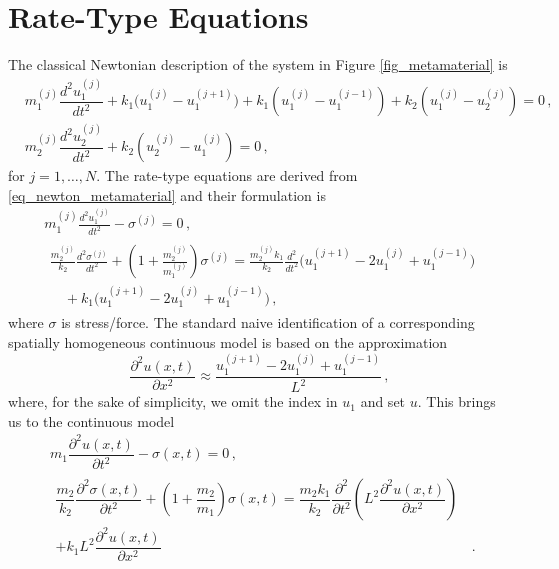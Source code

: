\documentclass[11pt,a4paper,oneside,openright]{report} %
\begin{document}
\section{Rate-Type Equations}
\noindent
The classical Newtonian description of the system in Figure \ref{fig_metamaterial} is
\begin{subequations}\label{eq_newton_metamaterial}
    \begin{align}
        & m_1^{(j)} \dfrac{d^2 u_1^{(j)}}{dt^2} + k_1 \bigl( u_1^{(j)} - u_1^{(j+1)}\bigr) + k_1 \left( u_1^{(j)} - u_1^{(j-1)} \right) + k_2 \left( u_1^{(j)} - u_2^{(j)} \right) = 0 \, , \\[5pt]
        & m_2^{(j)} \dfrac{d^2 u_2^{(j)}}{d t^2} +  k_2 \left( u_2^{(j)} - u_1^{(j)}  \right) = 0 \, ,
    \end{align}
\end{subequations}
for $j = 1, \dots,N$. The rate-type equations are derived from \eqref{eq_newton_metamaterial} and their formulation is
\begin{subequations}\label{eq_rate_type}
    \begin{align}
    & m_1^{(j)} \frac{d^2 u_1^{(j)}}{dt^2} - \sigma^{(j)} = 0 \, , 
        \label{} \\[5pt]
        &\begin{aligned}
        \frac{m_2^{(j)}}{k_2} \frac{d^2 \sigma^{(j)}}{dt^2} 
            + \left(1 + \frac{m_2^{(j)}}{m_1^{(j)}} \right) \sigma^{(j)} 
            = \frac{m_2^{(j)} k_1}{k_2} \frac{d^2 }{dt^2 } \bigl( u_1^{(j+1)} - 2 u_1^{(j)} + u_1^{(j-1)} \bigr) \; \, \\
            \quad + k_1 \bigl( u_1^{(j+1)} - 2 u_1^{(j)} + u_1^{(j-1)} \bigr) \, ,
        \end{aligned}
        \label{}
    \end{align}
\end{subequations}
where $\sigma$ is stress/force. The standard naive identification of a corresponding spatially homogeneous continuous model is based on the approximation
\begin{equation}
    \dfrac{\partial^2 u(x,t)}{\partial x^2 } \approx \dfrac{u_1^{(j+1)} - 2 u_1^{(j)} + u_1^{(j-1)}}{L^2} \, , 
\end{equation}
where, for the sake of simplicity, we omit the index in $u_1$ and set $u$. This brings us to the continuous model
\begin{subequations}\label{eq_rate_type_continuous}
    \begin{align}
        & m_1 \dfrac{\partial^2 u(x,t)}{\partial t^2} - \sigma(x,t)  = 0 \, , \\[5pt]
        & \begin{aligned}
            \dfrac{m_2}{k_2} \dfrac{\partial^2 \sigma(x,t)}{\partial t^2}  + \left(1 + \dfrac{m_2}{m_1} \right) \sigma(x,t)  = \dfrac{m_2 k_1}{k_2} \dfrac{\partial^2 }{\partial t^2 } \left(L^2 \dfrac{\partial^2 u(x,t)}{\partial x^2} \right) & \\ + k_1 L^2 \dfrac{\partial^2 u(x,t)}{\partial x^2} & \, .
        \end{aligned}
    \end{align}
\end{subequations}
\end{document}
